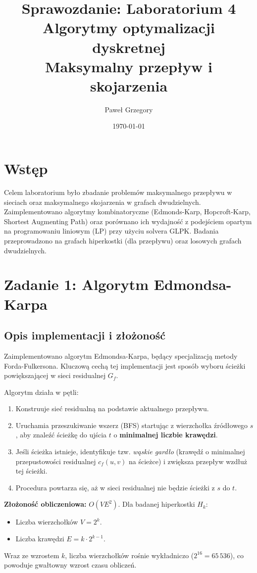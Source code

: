 \documentclass[a4paper,12pt]{article}
\title{\textbf{Sprawozdanie: Laboratorium 4}\\Algorytmy optymalizacji dyskretnej\\Maksymalny przepływ i skojarzenia}
\author{Paweł Grzegory}
\date{\today}
\begin{document}
\maketitle

\tableofcontents
\newpage

\section{Wstęp}
Celem laboratorium było zbadanie problemów maksymalnego przepływu w sieciach oraz maksymalnego skojarzenia w grafach dwudzielnych. Zaimplementowano algorytmy kombinatoryczne (Edmonds-Karp, Hopcroft-Karp, Shortest Augmenting Path) oraz porównano ich wydajność z podejściem opartym na programowaniu liniowym (LP) przy użyciu solvera GLPK. Badania przeprowadzono na grafach hiperkostki (dla przepływu) oraz losowych grafach dwudzielnych.

\section{Zadanie 1: Algorytm Edmondsa-Karpa}

\subsection{Opis implementacji i złożoność}
Zaimplementowano algorytm Edmondsa-Karpa, będący specjalizacją metody Forda-Fulkersona. Kluczową cechą tej implementacji jest sposób wyboru ścieżki powiększającej w sieci residualnej $G_f$.

Algorytm działa w pętli:
\begin{enumerate}
    \item Konstruuje sieć residualną na podstawie aktualnego przepływu.
    \item Uruchamia przeszukiwanie wszerz (BFS) startując z wierzchołka źródłowego $s$, aby znaleźć ścieżkę do ujścia $t$ o \textbf{minimalnej liczbie krawędzi}.
    \item Jeśli ścieżka istnieje, identyfikuje tzw. \textit{wąskie gardło} (krawędź o minimalnej przepustowości residualnej $c_f(u,v)$ na ścieżce) i zwiększa przepływ wzdłuż tej ścieżki.
    \item Procedura powtarza się, aż w sieci residualnej nie będzie ścieżki z $s$ do $t$.
\end{enumerate}

\textbf{Złożoność obliczeniowa:} $O(V E^2)$.
Dla badanej hiperkostki $H_k$:
\begin{itemize}
    \item Liczba wierzchołków $V = 2^k$.
    \item Liczba krawędzi $E = k \cdot 2^{k-1}$.
\end{itemize}
Wraz ze wzrostem $k$, liczba wierzchołków rośnie wykładniczo ($2^{16} = 65\,536$), co powoduje gwałtowny wzrost czasu obliczeń.
\end{document}
